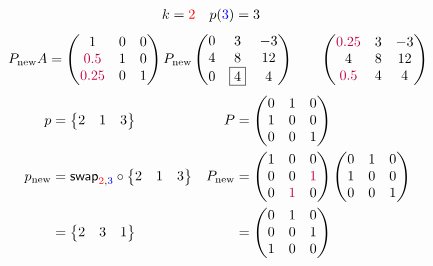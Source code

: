 \documentclass[pdf]{beamer}
\begin{document}
\begin{frame}{}\begin{align*} k &= {\color{red}2} & p({\color{blue}3}) &= 3\end{align*} $$P_{\text{new}}A=\begin{pmatrix}1&0&0\\{\color{purple}0.5}&1&0\\{\color{purple}0.25}&0&1\end{pmatrix} P_{\text{new}} \begin{pmatrix}0&3&-3\\4&8&12\\0&\boxed{4}&4\end{pmatrix} \quad\quad \begin{pmatrix}{\color{purple}0.25}&3&-3\\4&8&12\\{\color{purple}0.5}&4&4\end{pmatrix}$$ \begin{align*} p&= \begin{Bmatrix}2&1&3\end{Bmatrix} & P&= \begin{pmatrix}0&1&0\\1&0&0\\0&0&1\end{pmatrix}\\ p_{\text{new}} &= \mathsf{swap}_{{\color{red}2},{\color{blue}3}} \circ \begin{Bmatrix}2&1&3\end{Bmatrix} & P_{\text{new}} &= \begin{pmatrix}1&0&0\\0&0&{\color{purple}1}\\0&{\color{purple}1}&0\end{pmatrix} \begin{pmatrix}0&1&0\\1&0&0\\0&0&1\end{pmatrix}\\ &=\begin{Bmatrix}2&3&1\end{Bmatrix} &&=\begin{pmatrix}0&1&0\\0&0&1\\1&0&0\end{pmatrix}\end{align*}\end{frame}
\end{document}
